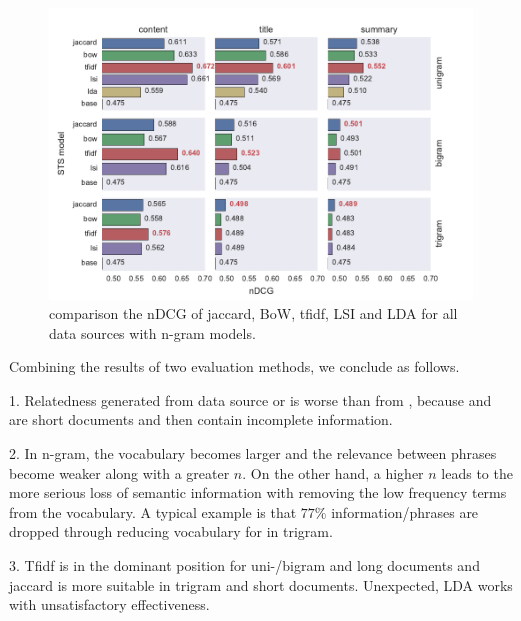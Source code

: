 \begin{figure}[!htb]
    \centering
    \includegraphics[width=\textwidth]{fig/ndcg}
    \caption{comparison the nDCG of jaccard, BoW, tfidf, LSI and LDA for all data sources with n-gram models.}
    \label{fig:ndcg}
\end{figure}


Combining the results of two evaluation methods, we conclude as follows.

1. Relatedness generated from data source \ititle{} or \isummary{} is worse than from \icontent{}, because \ititle{} and \isummary{} are short documents and then contain incomplete information. 

2. In n-gram, the vocabulary becomes larger and the relevance between phrases become weaker along with a greater $n$. On the other hand, a higher $n$ leads to the more serious loss of semantic information with removing the low frequency terms from the vocabulary. A typical example is that $77\%$ information/phrases are dropped through reducing vocabulary for \icontent{} in trigram. 

3. Tfidf is in the dominant position for uni-/bigram and long documents and jaccard is more suitable in trigram and short documents. Unexpected, LDA works with unsatisfactory effectiveness. 



